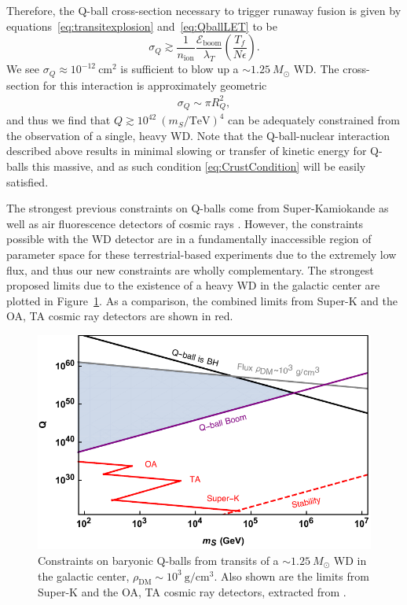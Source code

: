 \documentclass[preprintnumbers,amsmath,amssymb,prd, superscriptaddress,twocolumn]{revtex4}
\newcommand{\Eboom}{\mathcal{E}_\text{boom}}
\def\r{\right)}
\def\l{\left(}
\begin{document}
Therefore, the Q-ball cross-section necessary to trigger runaway fusion is given by equations~\eqref{eq:transitexplosion} and~\eqref{eq:QballLET} to be
\begin{equation}
\sigma_Q \gtrsim \frac{1}{n_\text{ion}} \frac{\Eboom}{\lambda_T} \l \frac{T_f}{N \epsilon} \r.
\end{equation}
We see $\sigma_Q \approx 10^{-12} ~\text{cm}^2$ is sufficient to blow up a $\sim 1.25 ~M_{\odot}$ WD.
The cross-section for this interaction is approximately geometric
\begin{align}
\sigma_Q \sim \pi R_Q^2,
\end{align}
and thus we find that $Q \gtrsim 10^{42} ~(m_S/\text{TeV})^4$ can be adequately constrained from the observation of a single, heavy WD.
Note that the Q-ball-nuclear interaction described above results in minimal slowing or transfer of kinetic energy for Q-balls this massive, and as such condition \eqref{eq:CrustCondition} will be easily satisfied.

The strongest previous constraints on Q-balls come from Super-Kamiokande as well as air fluorescence detectors of cosmic rays \cite{Dine:2003ax}.
However, the constraints possible with the WD detector are in a fundamentally inaccessible region of parameter space for these terrestrial-based experiments due to the extremely low flux, and thus our new constraints are wholly complementary.
The strongest proposed limits due to the existence of a heavy WD in the galactic center are plotted in Figure~\ref{fig:Qballconstraint}. As a comparison, the combined limits from Super-K and the OA, TA cosmic ray detectors are shown in red.
\begin{figure}
\includegraphics[scale=.55]{Qballconstraint.pdf}
\caption{Constraints on baryonic Q-balls from transits of a $\sim 1.25 ~M_{\odot}$ WD in the galactic center, $\rho_\text{DM} \sim 10^3 ~\text{g}/\text{cm}^3$. Also shown are the limits from Super-K and the OA, TA cosmic ray detectors, extracted from \cite{Dine:2003ax}.}
\label{fig:Qballconstraint}
\end{figure}
\end{document}
